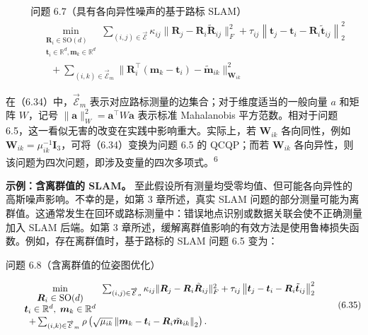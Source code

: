 \begin{equation}
\begin{array}{rl} & {\text{问题 6.7（具有各向异性噪声的基于路标 SLAM）}}\\ & {\quad \underset { \begin{array}{c}\boldsymbol{R}_i\in \mathrm{SO}(d)\\ \boldsymbol{t}_i\in \mathbb{R}^d, \boldsymbol{m}_k\in \mathbb{R}^d \end{array}}{\min}\sum_{(i,j)\in \overrightarrow{\mathcal{E}}}\kappa_{ij}\| \boldsymbol{R}_j - \boldsymbol{R}_i\tilde{\boldsymbol{R}}_{ij}\| _F^2 +\tau_{ij}\left\| \boldsymbol {t}_j - \boldsymbol {t}_i - \boldsymbol{R}_i\tilde{\boldsymbol{t}}_{ij}\right\| _2^2}\\ & {\qquad +\sum_{(i,k)\in \vec{\mathcal{E}}_m}\| \boldsymbol{R}_i^\top (\boldsymbol {m}_k - \boldsymbol {t}_i) - \tilde{\boldsymbol{m}}_{ik}\|_{\mathbf{W}_{ik}}^2} \end{array}\tag{6.34}
\end{equation}

在（6.34）中，$\vec { \mathcal { E } } _ { m }$ 表示对应路标测量的边集合；对于维度适当的一般向量 $a$ 和矩阵 $W$，记号 $\| \pmb { a } \| _ { W } ^ { 2 } = \pmb { a } ^ { \top } W \pmb { a }$ 表示标准 Mahalanobis 平方范数。相对于问题 6.5，这一看似无害的改变在实践中影响重大。实际上，若 $\mathbf { W } _ { i k }$ 各向同性，例如 $\mathbf { W } _ { i k } = \mu _ { i k } ^ { - 1 } \mathbf { I } _ { 3 }$，可将（6.34）变换为问题 6.5 的 QCQP；而若 $\mathbf { W } _ { i k }$ 各向异性，则该问题为四次问题，即涉及变量的四次多项式。\textsuperscript{6}

\textbf{示例：含离群值的 SLAM。} 至此假设所有测量均受零均值、但可能各向异性的高斯噪声影响。不幸的是，如第 3 章所述，真实 SLAM 问题的部分测量可能为离群值。这通常发生在回环或路标测量中：错误地点识别或数据关联会使不正确测量加入 SLAM 后端。如第 3 章所述，缓解离群值影响的有效方法是使用鲁棒损失函数。例如，存在离群值时，基于路标的 SLAM 问题 6.5 变为：

问题 6.8（含离群值的位姿图优化）

\begin{equation}
\begin{array}{r l} & {\underset { \begin{array}{c} \boldsymbol {R} _ {i} \in \mathrm{SO} (d) \\ \boldsymbol {t} _ {i} \in \mathbb {R} ^ {d},\; \boldsymbol {m} _ {k} \in \mathbb {R} ^ {d} \end{array} } {\min} \sum_ {(i, j) \in \overrightarrow {\mathcal {E}} _ {o}} \kappa_ {i j} \| \boldsymbol {R} _ {j} - \boldsymbol {R} _ {i} \tilde {\boldsymbol {R}} _ {i j} \| _ {F} ^ {2} + \tau_ {i j} \left\| \boldsymbol {t} _ {j} - \boldsymbol {t} _ {i} - \boldsymbol {R} _ {i} \tilde {\boldsymbol {t}} _ {i j} \right\| _ {2} ^ {2}} \\ & {\quad + \sum_ {(i, k) \in \overrightarrow {\mathcal {E}} _ {m}} \rho \left(\sqrt {\mu_ {i k}} \left\| \boldsymbol {m} _ {k} - \boldsymbol {t} _ {i} - \boldsymbol {R} _ {i} \tilde {\boldsymbol {m}} _ {i k} \right\| _ {2}\right).} \end{array}\tag{6.35}
\end{equation}

